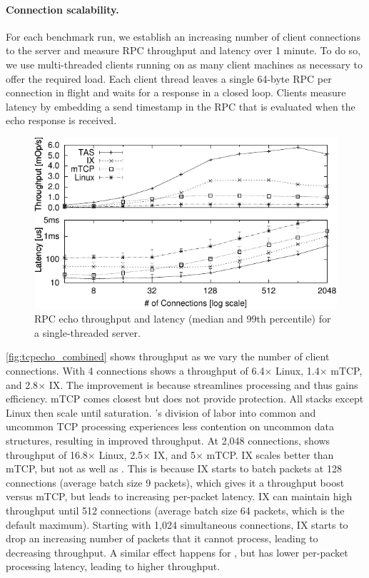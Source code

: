 \paragraph{Connection scalability.} 
For each benchmark run, we establish an increasing number of client
connections to the server and measure RPC throughput and latency over
1 minute. To do so, we use multi-threaded clients running on as many
client machines as necessary to offer the required load. Each client
thread leaves a single 64-byte RPC per connection in flight and waits
for a response in a closed loop. Clients measure latency by embedding
a send timestamp in the RPC that is evaluated when the echo response
is received.

\begin{figure}
  \centering
  \includegraphics[width=\columnwidth]{plots/urpc/urpc.pdf}
  \caption{RPC echo throughput and latency (median and 99th percentile) for a
  single-threaded server.}
  \label{fig:tcpecho_combined}
\end{figure}

\autoref{fig:tcpecho_combined} shows throughput as we vary the number
of client connections. With 4 connections \softtcp shows a throughput
of 6.4$\times$ Linux, 1.4$\times$ mTCP, and 2.8$\times$ IX. The
improvement is because \softtcp streamlines processing and thus gains
efficiency. mTCP comes closest but does not provide protection. All
stacks except Linux then scale until saturation. \softtcp's division
of labor into common and uncommon TCP processing experiences less
contention on uncommon data structures, resulting in improved
throughput. At 2,048 connections, \softtcp shows throughput of
16.8$\times$ Linux, 2.5$\times$ IX, and 5$\times$ mTCP. IX scales
better than mTCP, but not as well as \taas. This is because IX starts
to batch packets at 128 connections (average batch size 9 packets),
which gives it a throughput boost versus mTCP, but leads to increasing
per-packet latency. IX can maintain high throughput until 512
connections (average batch size 64 packets, which is the default
maximum). Starting with 1,024 simultaneous connections, IX starts to
drop an increasing number of packets that it cannot process, leading
to decreasing throughput. A similar effect happens for \taas, but
\taas has lower per-packet processing latency, leading to higher
throughput.

